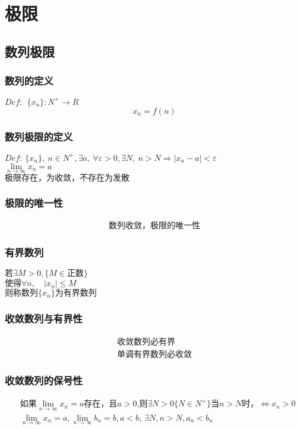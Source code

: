 \section{极限}\label{zhang_limit}
\subsection{数列极限}
\subsubsection{数列的定义}
$Def:\ \ \{x_n\}: N^+\rightarrow R $
$$x_n = f(n)$$
\subsubsection{数列极限的定义}
$Def:\ \{x_n\},\ n\in N^+,\exists  a,\ \forall\varepsilon>0,\exists N,\ n>N\Rightarrow \left|x_n-a\right|<\varepsilon$\\
$\lim\limits_{n \to \infty}{x_n}=a$\\ 
$\mbox{极限存在，为收敛，不存在为发散}$
\subsubsection{极限的唯一性}
\begin{align}
\mbox{数列收敛，极限的唯一性}\label{limit_sequence}
\end{align}
\subsubsection{有界数列}
$\mbox{若}\exists M>0,\{M\in\mbox{正数}\}$\\
$\mbox{使得}\forall n,\quad\left|x_n\right|\leqslant M$\\
$\mbox{则称数列$\{x_n\}$为有界数列}$
\subsubsection{收敛数列与有界性}
\begin{align}
    \mbox{收敛数列必有界}\label{sequence_bounded_1}\\
    \mbox{单调有界数列必收敛}\label{sequence_bounded_2}
\end{align}
\subsubsection{收敛数列的保号性}
\begin{align}
   &\mbox{如果$\lim\limits_{n \to\infty}x_n=a$存在，且$a>0$,则$\exists N>0\{N\in N^+\}$当$n>N$时，$\Leftrightarrow x_n>0$}\label{Serial_number_preservation_a}\\
    &\lim\limits_{n\to\infty}x_n=a,\lim\limits_{n\to\infty}b_n=b,a<b,\ \exists N,n>N,a_n<b_n \label{Serial_number_preservation_b}
\end{align}
